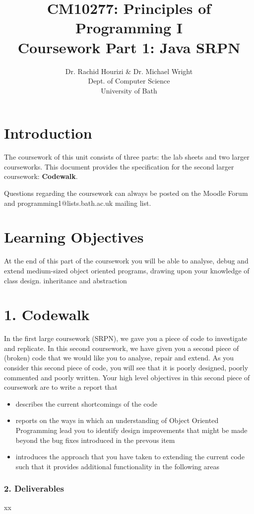 \documentclass[12pt, oneside]{article}   	%
\title{CM10277: Principles of Programming I \\ Coursework Part 1: Java SRPN}
\author{Dr. Rachid Hourizi \& Dr. Michael Wright \\ Dept. of Computer Science \\ University of Bath}
\date{}							%
\begin{document}
\maketitle
\section{Introduction}
The coursework of this unit consists of three parts: the lab sheets and two larger courseworks. This document provides the specification for the second larger coursework: \textbf{Codewalk}.

Questions regarding the coursework can always be posted on the Moodle Forum and programming1@lists.bath.ac.uk mailing list.

\section{Learning Objectives}
At the end of this part of the coursework you will be able to analyse, debug and extend medium-sized object oriented programs, drawing upon your knowledge of class design. inheritance and abstraction

\clearpage
\section{1. Codewalk}
In the first large coursework (SRPN), we gave you a piece of code to investigate and replicate. In this second coursework, we have given you a second piece of (broken) code that we would like you to analyse, repair and extend. As you consider this second piece of code, you will see that it is poorly designed, poorly commented and poorly written. Your high level objectives in this second piece of coursework are to write a report that

\begin{itemize}
\item describes the current shortcomings of the code
\item reports on the ways in which an understanding of Object Oriented Programming lead you to identify design improvements that might be made beyond the bug fixes introduced in the prevous item
\item  introduces the approach that you have taken to extending the current code such that it provides additional functionality in the following areas
\end{itemize}

\subsubsection*{2. Deliverables}
xx
\end{document}
